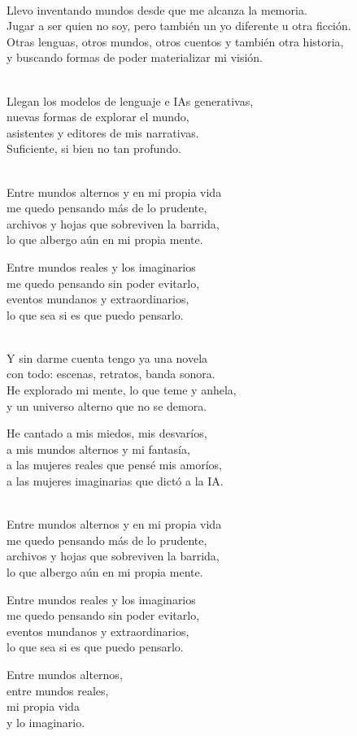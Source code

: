 \begin{lyrics}
\\
Llevo inventando mundos desde que me alcanza la memoria.\\
Jugar a ser quien no soy, pero también un yo diferente u otra ficción.\\
Otras lenguas, otros mundos, otros cuentos y también otra historia,\\
y buscando formas de poder materializar mi visión.

\\
Llegan los modelos de lenguaje e IAs generativas,\\
nuevas formas de explorar el mundo,\\
asistentes y editores de mis narrativas.\\
Suficiente, si bien no tan profundo.

\\
Entre mundos alternos y en mi propia vida\\
me quedo pensando más de lo prudente,\\
archivos y hojas que sobreviven la barrida,\\
lo que albergo aún en mi propia mente.

Entre mundos reales y los imaginarios\\
me quedo pensando sin poder evitarlo,\\
eventos mundanos y extraordinarios,\\
lo que sea si es que puedo pensarlo.

\\
Y sin darme cuenta tengo ya una novela\\
con todo: escenas, retratos, banda sonora.\\
He explorado mi mente, lo que teme y anhela,\\
y un universo alterno que no se demora.

He cantado a mis miedos, mis desvaríos,\\
a mis mundos alternos y mi fantasía,\\
a las mujeres reales que pensé mis amoríos,\\
a las mujeres imaginarias que dictó a la IA.

\\
Entre mundos alternos y en mi propia vida\\
me quedo pensando más de lo prudente,\\
archivos y hojas que sobreviven la barrida,\\
lo que albergo aún en mi propia mente.

Entre mundos reales y los imaginarios\\
me quedo pensando sin poder evitarlo,\\
eventos mundanos y extraordinarios,\\
lo que sea si es que puedo pensarlo.

Entre mundos alternos,\\
entre mundos reales,\\
mi propia vida\\
y lo imaginario.
\end{lyrics}

